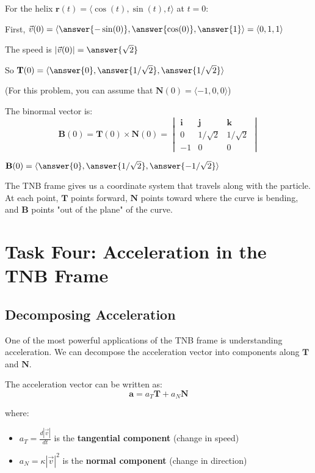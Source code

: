 \documentclass{ximera}
\begin{document}
\begin{problem}
For the helix $\mathbf{r}(t) = \langle \cos(t), \sin(t), t \rangle$ at $t = 0$:

First, $\vec{v}(0) = \langle \answer{-\sin(0)}, \answer{\cos(0)}, \answer{1} \rangle = \langle 0, 1, 1 \rangle$

The speed is $|\vec{v}(0)| = \answer{\sqrt{2}}$

So $\mathbf{T}(0) = \langle \answer{0}, \answer{1/\sqrt{2}}, \answer{1/\sqrt{2}} \rangle$

(For this problem, you can assume that $\mathbf{N}(0) = \langle -1, 0, 0 \rangle$)

The binormal vector is:
\[\mathbf{B}(0) = \mathbf{T}(0) \times \mathbf{N}(0) = \begin{vmatrix} \mathbf{i} & \mathbf{j} & \mathbf{k} \\ 0 & 1/\sqrt{2} & 1/\sqrt{2} \\ -1 & 0 & 0 \end{vmatrix}\]

$\mathbf{B}(0) = \langle \answer{0}, \answer{1/\sqrt{2}}, \answer{-1/\sqrt{2}} \rangle$

\begin{feedback}
The TNB frame gives us a coordinate system that travels along with the particle. At each point, $\mathbf{T}$ points forward, $\mathbf{N}$ points toward where the curve is bending, and $\mathbf{B}$ points "out of the plane" of the curve.
\end{feedback}
\end{problem}

\section*{Task Four: Acceleration in the TNB Frame}

\subsection*{Decomposing Acceleration}

One of the most powerful applications of the TNB frame is understanding acceleration. We can decompose the acceleration vector into components along $\mathbf{T}$ and $\mathbf{N}$.

\begin{definition}
The acceleration vector can be written as:
\[\mathbf{a} = a_T \mathbf{T} + a_N \mathbf{N}\]

where:
\begin{itemize}
    \item $a_T = \frac{d|\vec{v}|}{dt}$ is the \textbf{tangential component} (change in speed)
    \item $a_N = \kappa |\vec{v}|^2$ is the \textbf{normal component} (change in direction)
\end{itemize}
\end{definition}
\end{document}
